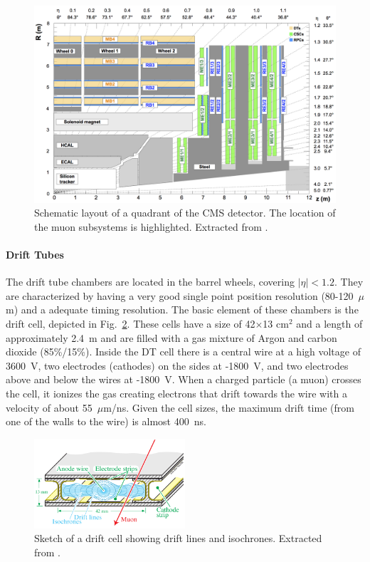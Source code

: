 \documentclass[../main.tex]{subfiles}
\begin{document}
\begin{figure}
\begin{center}
\includegraphics[width=\textwidth]{Images/muonsystem}
\end{center}
\caption{Schematic layout of a quadrant of the CMS detector. The location of the muon subsystems is highlighted. Extracted from \cite{intro:id:muon_13tev}.}
\label{intro:fig:muon}
\end{figure}

\paragraph{Drift Tubes}
The drift tube chambers are located in the barrel wheels, covering $|\eta|<1.2$. They are characterized by having a very good single point position resolution (80-120~$\mu$m) and a adequate timing resolution. The basic element of these chambers is the drift cell, depicted in Fig.~\ref{intro:fig:dtcell}. These cells have a size of 42$\times$13 cm${}^2$ and a length of approximately 2.4~m and are filled with a gas mixture of Argon and carbon dioxide (85\%/15\%). Inside the DT cell there is a central wire at a high voltage of 3600~V, two electrodes (cathodes) on the sides at -1800~V, and two electrodes above and below the wires at -1800~V. When a charged particle (a muon) crosses the cell, it ionizes the gas creating electrons that drift towards the wire with a velocity of about 55~$\mu$m/ns. Given the cell sizes, the maximum drift time (from one of the walls to the wire) is almost 400~ns.

\begin{figure}
\begin{center}
\includegraphics[width=0.5\textwidth]{Images/Celda.png}
\end{center}
\caption{Sketch of a drift cell showing drift lines and isochrones. Extracted from \cite{intro:exp:cms}.}
\label{intro:fig:dtcell}
\end{figure}
\end{document}
